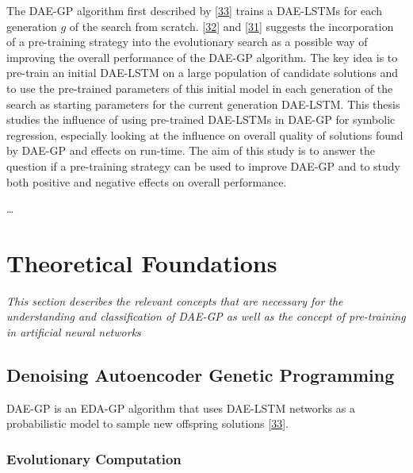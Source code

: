 \documentclass[
  11pt,
]{article}
\begin{document}
The DAE-GP algorithm first described by {[}\protect\hyperlink{ref-dae-gp_2020_rtree}{33}{]} trains a DAE-LSTMs for each generation \(g\) of the search from scratch.
{[}\protect\hyperlink{ref-dae-gp_2022_symreg}{32}{]} and {[}\protect\hyperlink{ref-daegp_explore_exploit}{31}{]} suggests the incorporation of a pre-training strategy into the evolutionary search as a possible way of improving the overall performance of the DAE-GP algorithm.
The key idea is to pre-train an initial DAE-LSTM on a large population of candidate solutions and to use the pre-trained parameters of this initial model in each generation of the search as starting parameters for the current generation DAE-LSTM.
This thesis studies the influence of using pre-trained DAE-LSTMs in DAE-GP for symbolic regression, especially looking at the influence on overall quality of solutions found by DAE-GP and effects on run-time.
The aim of this study is to answer the question if a pre-training strategy can be used to improve DAE-GP and to study both positive and negative effects on overall performance.

\ldots{}

\hypertarget{theoretical-foundations}{%
\section{Theoretical Foundations}\label{theoretical-foundations}}

\emph{This section describes the relevant concepts that are necessary for the understanding and classification of DAE-GP as well as the concept of pre-training in artificial neural networks}

\hypertarget{denoising-autoencoder-genetic-programming}{%
\subsection{Denoising Autoencoder Genetic Programming}\label{denoising-autoencoder-genetic-programming}}

DAE-GP is an EDA-GP algorithm that uses DAE-LSTM networks as a probabilistic model to sample new offspring solutions {[}\protect\hyperlink{ref-dae-gp_2020_rtree}{33}{]}.

\hypertarget{evolutionary-computation}{%
\subsubsection{Evolutionary Computation}\label{evolutionary-computation}}
\end{document}
